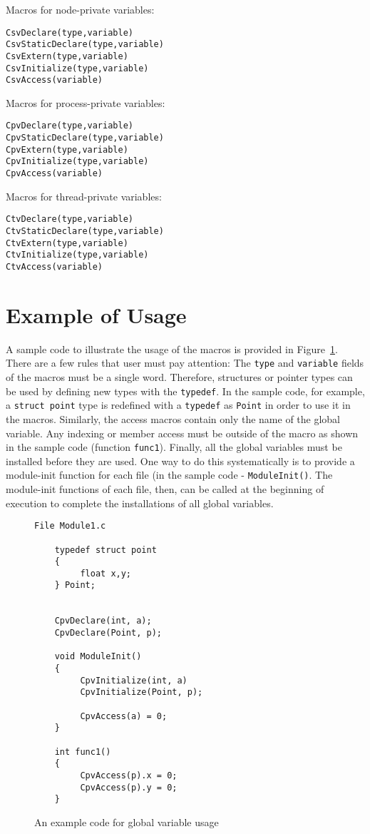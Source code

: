 Macros for node-private variables:
\begin{verbatim}
CsvDeclare(type,variable)
CsvStaticDeclare(type,variable)
CsvExtern(type,variable)
CsvInitialize(type,variable)
CsvAccess(variable)
\end{verbatim}


Macros for process-private variables:
\begin{verbatim}
CpvDeclare(type,variable)
CpvStaticDeclare(type,variable)
CpvExtern(type,variable)
CpvInitialize(type,variable)
CpvAccess(variable)
\end{verbatim}

Macros for thread-private variables:
\begin{verbatim}
CtvDeclare(type,variable)
CtvStaticDeclare(type,variable)
CtvExtern(type,variable)
CtvInitialize(type,variable)
CtvAccess(variable)
\end{verbatim}


\section{Example of Usage}

    A sample code to illustrate the usage of the macros is provided
    in Figure~\ref{fig:cpv}.
    There are a few rules that user must pay attention: The
    {\tt type} and {\tt variable} fields of the macros must be a single
    word. Therefore, structures or pointer types can be used by defining
    new types with the {\tt typedef}. In the sample code, for example,
    a {\tt struct point} type is redefined with a {\tt typedef} as {\tt Point}
    in order to use it in the macros. Similarly,  the access macros contain
    only the name of the global variable. Any indexing or member access
    must be outside of the macro as shown in the sample code 
    (function {\tt func1}). Finally, all the global variables must be
    installed before they are used. One way to do this systematically is
    to provide a module-init function for each file (in the sample code - 
    {\tt ModuleInit()}. The module-init functions of each file, then, can be 
    called at the beginning of execution to complete the installations of 
    all global variables.
    
\begin{figure}
\begin{verbatim}
File Module1.c

    typedef struct point
    {
         float x,y;
    } Point;


    CpvDeclare(int, a);
    CpvDeclare(Point, p);

    void ModuleInit()
    {
         CpvInitialize(int, a)
         CpvInitialize(Point, p);

         CpvAccess(a) = 0;
    }

    int func1() 
    {
         CpvAccess(p).x = 0;
         CpvAccess(p).y = 0;
    }
\end{verbatim}
\caption{An example code for global variable usage}
\label{fig:cpv}
\end{figure}

